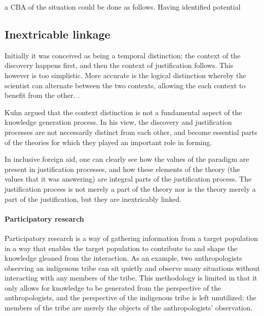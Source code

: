 \documentclass[a4paper]{article}
\begin{document}
a CBA of the situation could be done as follows. Having identified potential 



\subsection{Inextricable linkage}

Initially it was conceived as being a temporal distinction; the
context of the discovery happens first, and then the context of justification
follows. This however is too simplistic.  More accurate is the logical
distinction whereby the scientist can alternate between the two contexts,
allowing the each context to benefit from the other.
\cite{hoyningen2006context}.

Kuhn argued that the context distinction is not a fundamental aspect of the
knowledge generation process. In his view, the discovery and justification
processes are not necessarily distinct from each other, and become essential
parts of the theories for which they played an important role in forming.

In inclusive foreign aid, one can clearly see how the values of the paradigm
are present in justification processes, and how these elements of the theory (the
values that it was answering) are integral parts of the justification process.
The justification process is not merely a part of the theory nor is the theory
merely a part of the justification, but they are inextricably linked.

\paragraph{Participatory research}
\label{part}

Participatory research is a way of gathering information from a target
population in a way that enables the target population to contribute to and
shape the knowledge gleaned from the interaction. As an example, two
anthropologists observing an indigenous tribe can sit quietly and observe many
situations without interacting with any members of the tribe. This methodology
is limited in that it only allows for knowledge to be generated from the
perspective of the anthropologists, and the perspective of the indigenous
tribe is left unutilized; the members of the tribe are merely the objects of
the anthropologists' observation. 
\end{document}
